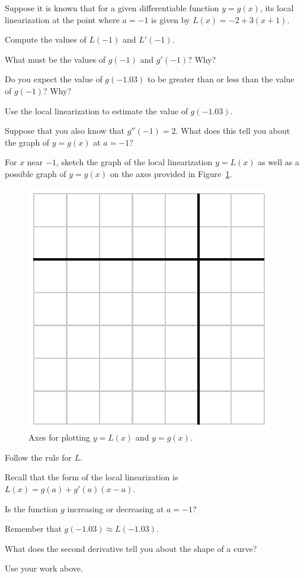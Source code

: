 \begin{activity} \label{A:1.8.1}
Suppose it is known that for a given differentiable function $y = g(x)$, its local linearization at the point where $a = -1$ is given by $L(x) = -2 + 3(x+1)$.
\ba
	\item Compute the values of $L(-1)$ and $L'(-1)$.
	\item What must be the values of $g(-1)$ and $g'(-1)$?  Why?
	\item Do you expect the value of $g(-1.03)$ to be greater than or less than the value of $g(-1)$?  Why?
	\item Use the local linearization to estimate the value of $g(-1.03)$.
	\item Suppose that you also know that $g''(-1) = 2.$  What does this tell you about the graph of $y = g(x)$ at $a = -1$?
	\item For $x$ near $-1$, sketch the graph of the local linearization $y = L(x)$ as well as a possible graph of $y = g(x)$ on the axes provided in Figure~\ref{F:1.8.Act1}.
\ea
\begin{figure}[h]
\begin{center}
\includegraphics{figures/1_8_Act1.eps}
\caption{Axes for plotting $y = L(x)$ and $y = g(x)$.} \label{F:1.8.Act1}
\end{center}
\end{figure}
\end{activity}

\begin{smallhint}
\ba
	\item Follow the rule for $L$.
	\item Recall that the form of the local linearization is $L(x) = g(a) + g'(a)(x-a)$.
	\item Is the function $g$ increasing or decreasing at $a = -1$?
	\item Remember that $g(-1.03) \approx L(-1.03)$.
	\item What does the second derivative tell you about the shape of a curve?
	\item Use your work above.
\ea
\end{smallhint}

